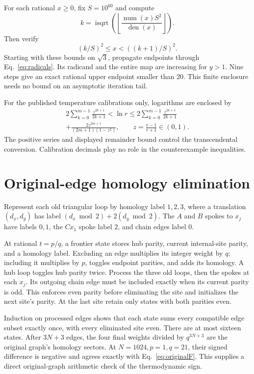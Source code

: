 \documentclass[aps,pre,reprint,amsmath,amssymb,nofootinbib,longbibliography,floatfix]{revtex4-2}
\begin{document}
For each rational \(x\geq0\), fix \(S=10^{60}\) and compute
\begin{equation}
 k=\operatorname{isqrt}
       \!\left(\left\lfloor\frac{\operatorname{num}(x)S^2}
                                      {\operatorname{den}(x)}\right\rfloor\right).
\end{equation}
Then verify
\begin{equation}
 (k/S)^2\leq x<((k+1)/S)^2.
\end{equation}
Starting with these bounds on \(\sqrt3\), propagate endpoints through Eq.~\eqref{eq:radicals}. Its radicand and the entire map are increasing for \(y>1\). Nine steps give an exact rational upper endpoint smaller than 20. This finite enclosure needs no bound on an asymptotic iteration tail.

For the published temperature calibrations only, logarithms are enclosed by
\begin{equation}
\begin{split}
 2\sum_{k=0}^{m-1}\frac{z^{2k+1}}{2k+1}
 <\ln r\leq
 2\sum_{k=0}^{m-1}\frac{z^{2k+1}}{2k+1}\\
 +\frac{2z^{2m+1}}{(2m+1)(1-z^2)},\qquad
 z=\frac{r-1}{r+1}\in(0,1).
\end{split}
\end{equation}
The positive series and displayed remainder bound control the transcendental conversion. Calibration decimals play no role in the counterexample inequalities.

\section{Original-edge homology elimination}
Represent each old triangular loop by homology label \(1,2,3\), where a translation \((d_x,d_y)\) has label \((d_x\bmod2)+2(d_y\bmod2)\). The \(A\) and \(B\) spokes to \(x_j\) have labels \(0,1\), the \(C x_1\) spoke label \(2\), and chain edges label \(0\).

At rational \(t=p/q\), a frontier state stores hub parity, current internal-site parity, and a homology label. Excluding an edge multiplies its integer weight by \(q\); including it multiplies by \(p\), toggles endpoint parities, and adds its homology. A hub loop toggles hub parity twice. Process the three old loops, then the spokes at each \(x_j\). Its outgoing chain edge must be included exactly when its current parity is odd. This enforces even parity before eliminating the site and initializes the next site's parity. At the last site retain only states with both parities even.

Induction on processed edges shows that each state sums every compatible edge subset exactly once, with every eliminated site even. There are at most sixteen states. After \(3N+3\) edges, the four final weights divided by \(q^{3N+3}\) are the original graph's homology sectors. At \(N=1024,p=1,q=21\), their signed difference is negative and agrees exactly with Eq.~\eqref{eq:originalF}. This supplies a direct original-graph arithmetic check of the thermodynamic sign.


\end{document}
